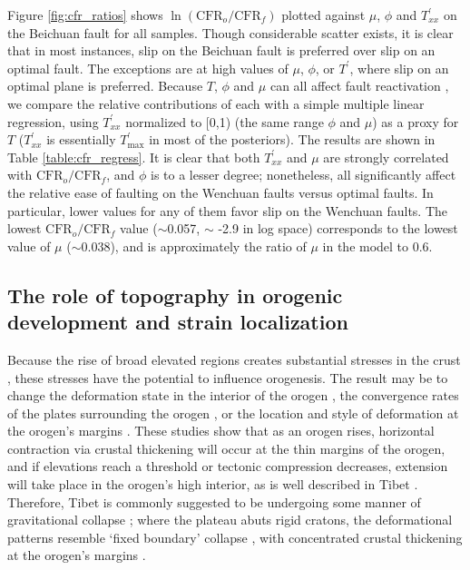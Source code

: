 \documentclass[draft,jgrga]{AGUTeX}
\begin{document}
\begin{article}
Figure \ref{fig:cfr_ratios} shows
$\ln (\mathrm{CFR}_o / \mathrm{CFR}_f)$ plotted against $\mu$, $\phi$
and $T^\prime_{xx}$ on the Beichuan fault for all samples. Though
considerable scatter exists, it is clear that in most instances, slip on
the Beichuan fault is preferred over slip on an optimal fault. The
exceptions are at high values of $\mu$, $\phi$, or $T^\prime$, where
slip on an optimal plane is preferred. Because $T$, $\phi$ and $\mu$ can
all affect fault reactivation \citep[e.g.,][]{sibson1985}, we compare the
relative contributions of each with a simple multiple linear regression,
using $T^\prime_{xx}$ normalized to [0,1) (the same range $\phi$ and
$\mu$) as a proxy for $T$ ($T^\prime_{xx}$ is essentially
$T^\prime_{\mathrm{max}}$ in most of the posteriors). The results are
shown in Table \ref{table:cfr_regress}. It is clear that both $T^\prime_{xx}$
and $\mu$ are strongly correlated with $\mathrm{CFR}_o/\mathrm{CFR}_f$, and $\phi$ is to a lesser degree; nonetheless, all
significantly affect the relative ease of faulting on the Wenchuan faults
versus optimal faults. In particular, lower values for any of them favor slip
on the Wenchuan faults. The lowest $\mathrm{CFR}_o/\mathrm{CFR}_f$ value
($\sim$0.057, $\sim$ -2.9 in log space) corresponds to the lowest value of
$\mu$ ($\sim$0.038), and is approximately the ratio of $\mu$ in the model
to 0.6.


\subsection{The role of topography in orogenic development and strain
localization}\label{the-role-of-topography-in-orogenic-development-and-strain-localization}

Because the rise of broad elevated regions creates substantial stresses
in the crust \citep[e.g.,][]{jeffreys1924}, these stresses have the
potential to influence orogenesis. The result may be to change the deformation
state in the interior of the orogen \citep[e.g.,][]{dewey1988, molnar1988}, the
convergence rates of the plates surrounding the orogen \citep[e.g.][]
{meade2008}, or the location and style of deformation at the orogen's
margins \citep[e.g.,][]{beaumont2001, decelles2009}. These studies show that
as an orogen rises, horizontal contraction via crustal thickening will
occur at the thin margins of the orogen, and if elevations reach a
threshold or tectonic compression decreases, extension will take place
in the orogen's high interior, as is well described in Tibet
\citep[e.g.,][]{armijo1986, taylor2003, styron2015}. Therefore,
Tibet is commonly suggested to be undergoing some manner of
gravitational collapse \citep[e.g.,][]{england1989}; where the plateau abuts
rigid cratons, the deformational patterns resemble `fixed boundary'
collapse \citep{rey2001}, with concentrated crustal thickening at the
orogen's margins \citep[e.g.,][]{cook2008}.


\end{article}
\end{document}
